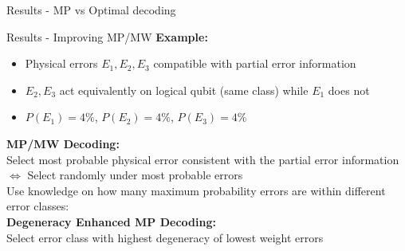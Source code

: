 \documentclass{dfki}
\begin{document}
\begin{frame}{Results - MP vs Optimal decoding}
{\begin{textblock*}{7.5cm}
		\end{textblock*}
	}
\end{frame}

\begin{frame}{Results - Improving MP/MW}
	\textbf{Example:}
	\begin{itemize}
		\item Physical errors $E_{1}, E_{2}, E_{3}$ compatible with partial error information\\
		\pause
		\item $E_{2}, E_{3}$ act equivalently on logical qubit (same class) while $E_{1}$ does not\\
		\pause
		\item $P(E_{1})=4\%$, $P(E_{2})=4\%$, $P(E_{3})=4\%$
	\end{itemize}
	\pause
	\textbf{MP/MW Decoding:}\\
	Select most probable physical error consistent with the partial error information\\
	$\Leftrightarrow$ Select randomly under most probable errors\\
	\pause
	Use knowledge on how many maximum probability errors are within different error classes:\\
	\textbf{Degeneracy Enhanced MP Decoding:}\\
	Select error class with highest degeneracy of lowest weight errors\\
\end{frame}
\end{document}
